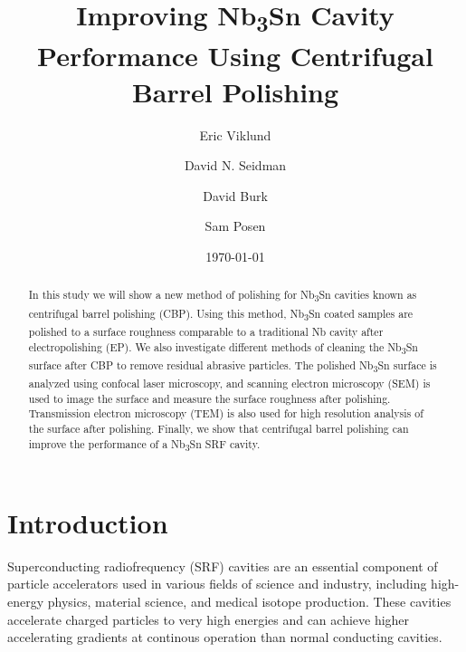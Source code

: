 \documentclass[reprint,amsmath,amssymb,aps]{revtex4-2}%
\begin{document}
%
\normalsize%
\title{Improving Nb\textsubscript{3}Sn Cavity Performance Using Centrifugal Barrel Polishing}%
\author{Eric Viklund}%
%
%
\author{David N. Seidman}%
%
\author{David Burk}%
%
\author{Sam Posen}%
%
\date{\today}%

\begin{abstract}%
In this study we will show a new method of polishing for Nb\textsubscript{3}Sn cavities known as centrifugal barrel polishing (CBP). Using this method, Nb\textsubscript{3}Sn coated samples are polished to a surface roughness comparable to a traditional Nb cavity after electropolishing (EP). We also investigate different methods of cleaning the Nb\textsubscript{3}Sn surface after CBP to remove residual abrasive particles. The polished Nb\textsubscript{3}Sn surface is analyzed using confocal laser microscopy, and scanning electron microscopy (SEM) is used to image the surface and measure the surface roughness after polishing. Transmission electron microscopy (TEM) is also used for high resolution analysis of the surface after polishing. Finally, we show that centrifugal barrel polishing can improve the performance of a Nb\textsubscript{3}Sn SRF cavity.
%
\end{abstract}%

\maketitle%

\section{Introduction}%
\label{sec:Introduction}%
Superconducting radiofrequency (SRF) cavities are an essential component of particle accelerators used in various fields of science and industry, including high-energy physics, material science, and medical isotope production\cite{boulware2019high}. These cavities accelerate charged particles to very high energies and can achieve higher accelerating gradients at continous operation than normal conducting cavities.
\end{document}
